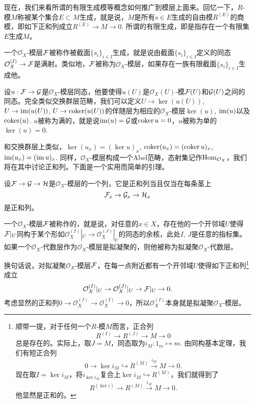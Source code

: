 现在，我们来看所谓的有限生成模等概念如何推广到模层上面来。回忆一下，$R$-模$M$称被某个集合$E\subset M$生成，就是说，$M$是所有$s\in E$生成的自由模$R^{(E)}$的商模，即如下正和列成立$R^{(E)}\to M \to 0$. 所谓的有限生成，即是指存在一个有限集$E$生成$M$。

\begin{para}[有限生成模层]
一个$\mathcal{O}_X$-模层$\mathcal{F}$被称作被截面$\{s_i\}_{i\in I}$生成，就是说由截面$\{s_i\}_{i\in I}$定义的同态$\mathcal{O}_X^{(I)}\to \mathcal{F}$是满射。类似地，$\mathcal{F}$被称为$\mathcal{O}_X$-模层，如果存在一族有限截面$\{s_i\}_{i\in I}$生成他。
\end{para}

\begin{para}
设$u:\mathcal{F}\to \mathcal{G}$是$\mathcal{O}_X$-模层同态，他要使得$u(U)$是$\mathcal{O}_X(U)$-模$\mathcal{F}(U)$和$\mathcal{G}(U)$之间的同态。完全类似交换群层范畴，我们可以定义$U\to \ker(u(U))$, $U\to \operatorname{im}(u(U))$, $U\to \operatorname{coker}(u(U))$的伴随层为相应的$\mathcal{O}_X$-模层$\ker(u)$, $\operatorname{im}(u)$以及$\operatorname{coker}(u)$. $u$被称为满的，就是说$\operatorname{im}(u)=\mathcal{G}$或$\operatorname{coker} u=0$，$u$被称为单的$\ker(u)=0$. 
\end{para}

和交换群层上类似，$\ker(u_x)=(\ker u)_x$, $\operatorname{coker}(u_x)=(\operatorname{coker} u)_x$, $\operatorname{im}(u_x)=(\operatorname{im} u)_x$. 同样，$\mathcal{O}_X$-模层构成一个Abel范畴，态射集记作$\operatorname{Hom}_{\mathcal{O}_X}$，我们将在其中讨论正和列。下面是一个实用而简单的引理。

\begin{lem}
设$\mathcal{F}\to \mathcal{G} \to \mathcal{H}$是$\mathcal{O}_X$-模层的一个列，它是正和列当且仅当在每条茎上
\[
	\mathcal{F}_x\to\mathcal{G}_x\to \mathcal{H}_x
\]
是正和列。
\end{lem}

\begin{para}[拟凝聚层]
一个$\mathcal{O}_X$-模层$\mathcal{F}$被称作的，就是说，对任意的$x\in X$，存在他的一个开邻域$U$使得$\mathcal{F}|_U$同构于某个形如$\mathcal{O}_X^{(I)}|_U\to \mathcal{O}_X^{(J)}|_U$的同态的余核，此处$I$, $J$是任意的指标集。如果一个$\mathcal{O}_X$-代数层作为$\mathcal{O}_X$-模层是拟凝聚的，则他被称为拟凝聚$\mathcal{O}_X$-代数层。

换句话说，对拟凝聚$\mathcal{O}_X$-模层$\mathcal{F}$，在每一点附近都有一个开邻域$U$使得如下正和列\footnote{顺带一提，对于任何一个$R$-模$M$而言，正合列
\[
	R^{(I)}\to R^{(J)}\to M\to 0
\]
总是存在的。实际上，取$J=M$，同态取为$i_M:1_m\mapsto m$. 由同构基本定理，我们有短正合列
\[
	0\to \ker i_M\hookrightarrow R^{(M)} \xrightarrow{i_M} M \to 0.
\]
现在取$I=\ker i_M$，将$i_{\ker i_M}$复合上$\ker i_M\hookrightarrow R^{(M)}$，我们就得到了
\[
	R^{(\ker i)}\to R^{(M)} \xrightarrow{i_M} M \to 0.
\]
他显然是正和的。}成立
\[
	\mathcal{O}_X^{(I)}|_U\to \mathcal{O}_X^{(J)}|_U\to \mathcal{F}|_U\to 0.
\]
考虑显然的正和列$0\to \mathcal{O}_X^{(I)}\to \mathcal{O}_X^{(I)} \to 0$，所以$\mathcal{O}_X^{(I)}$本身就是拟凝聚$\mathcal{O}_X$-模层。
\end{para}



